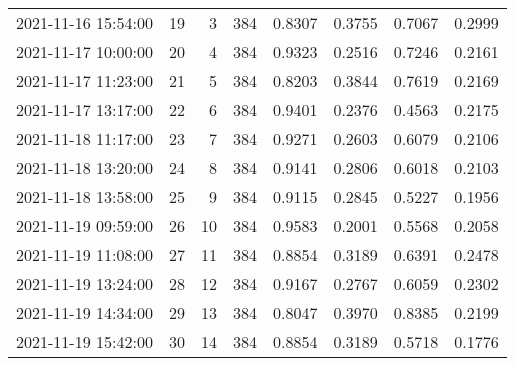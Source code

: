 \begin{table}
\begin{tabular}{lrrrrrrr}
2021-11-16 15:54:00 &   19 &    3 &    384 &   0.8307 & 0.3755 & 0.7067 & 0.2999 \\
2021-11-17 10:00:00 &   20 &    4 &    384 &   0.9323 & 0.2516 & 0.7246 & 0.2161 \\
2021-11-17 11:23:00 &   21 &    5 &    384 &   0.8203 & 0.3844 & 0.7619 & 0.2169 \\
2021-11-17 13:17:00 &   22 &    6 &    384 &   0.9401 & 0.2376 & 0.4563 & 0.2175 \\
2021-11-18 11:17:00 &   23 &    7 &    384 &   0.9271 & 0.2603 & 0.6079 & 0.2106 \\
2021-11-18 13:20:00 &   24 &    8 &    384 &   0.9141 & 0.2806 & 0.6018 & 0.2103 \\
2021-11-18 13:58:00 &   25 &    9 &    384 &   0.9115 & 0.2845 & 0.5227 & 0.1956 \\
2021-11-19 09:59:00 &   26 &   10 &    384 &   0.9583 & 0.2001 & 0.5568 & 0.2058 \\
2021-11-19 11:08:00 &   27 &   11 &    384 &   0.8854 & 0.3189 & 0.6391 & 0.2478 \\
2021-11-19 13:24:00 &   28 &   12 &    384 &   0.9167 & 0.2767 & 0.6059 & 0.2302 \\
2021-11-19 14:34:00 &   29 &   13 &    384 &   0.8047 & 0.3970 & 0.8385 & 0.2199 \\
2021-11-19 15:42:00 &   30 &   14 &    384 &   0.8854 & 0.3189 & 0.5718 & 0.1776 \\
\bottomrule
\end{tabular}
\end{table}

